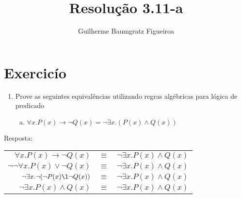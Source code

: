 \documentclass[aspectratio=43]{beamer}
\title[\sc{Resolu\c c\~ao}]{Resolu\c c\~ao 3.11-a}
\author[Guilherme Baumgratz Figueiroa]{Guilherme Baumgratz Figueiroa}
\institute[UFOP]{Universidade Federal de Ouro Preto} %
\date{}
\begin{document}
	
\begin{frame}
	\titlepage
\end{frame}

\section{Exercic\'io}

\begin{frame}%
	\begin{enumerate}[1.]
		\item Prove as seguintes equival\^encias utilizando regras alg\'ebricas para l\'ogica de predicado

	\begin{enumerate}[a)]
		
		\item $\forall x.P(x)\to\neg Q(x) = \neg\exists x.(P(x)\land Q(x))$ \\
		
	\end{enumerate}
	
	\end{enumerate}
	Resposta:
	\\
	\centering
	\pause
	
	\begin{tabular}{rcl}
		$\forall x. P(x)\to\neg Q(x)$ & $\equiv$ & $\neg\exists x.P(x)\land Q(x)$\\
		\pause
		$\neg \neg \forall x.P(x)\lor\neg Q(x)$  & $\equiv$ & $\neg\exists x.P(x)\land Q(x)$ \\
		\pause
		$\neg\exists x.\neg (\neg P(x)\l\neg Q(x))$  & $\equiv$ & $\neg\exists x.P(x)\land Q(x)$ \\
		\pause
		$\neg\exists x. P(x) \land Q(x)$  & $\equiv$ & $\neg\exists x.P(x)\land Q(x)$ 
	\end{tabular}
	
	
\end{frame}
\end{document}
